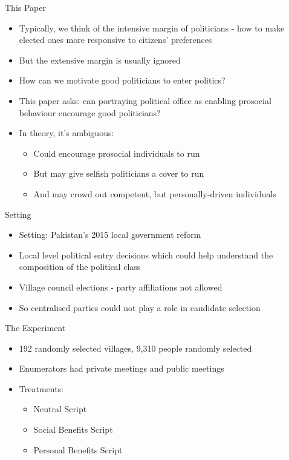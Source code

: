 \documentclass[11pt,notes=hide,aspectratio=169,mathserif]{beamer}
\begin{document}
\begin{frame}{This Paper}
\begin{itemize}
\item Typically, we think of the intensive margin of politicians - how to make elected ones more responsive to citizens' preferences
\pause \item But the extensive margin is usually ignored
\pause \item How can we motivate good politicians to enter politics? 
\pause \item This paper asks: can portraying political office as enabling prosocial behaviour encourage good politicians? 
\pause \item In theory, it's ambiguous:
\begin{itemize}
    \pause \item Could encourage prosocial individuals to run
    \pause \item But may give selfish politicians a cover to run
    \pause \item And may crowd out competent, but personally-driven individuals
\end{itemize}
\end{itemize}
\end{frame}

\begin{frame}{Setting}
\begin{itemize}
\item Setting: Pakistan's 2015 local government reform 
\item Local level political entry decisions which could help understand the composition of the political class 
\item Village council elections - party affiliations not allowed
\item So centralised parties could not play a role in candidate selection
\end{itemize}
\end{frame}

\begin{frame}{The Experiment}
\begin{itemize}
\item 192 randomly selected villages, 9,310 people randomly selected 
\item Enumerators had private meetings and public meetings 
\item Treatments:
\begin{itemize}
    \item Neutral Script 
    \item Social Benefits Script
    \item Personal Benefits Script
\end{itemize}
\end{itemize}
\end{frame}
\end{document}
